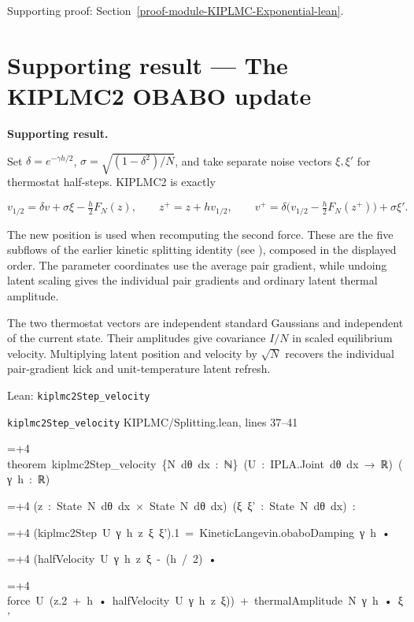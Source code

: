 \documentclass[11pt,a4paper]{report}
\newlength{\leancharwidth}
\newenvironment{leancode}{\par\smallskip\begingroup\ttfamily\footnotesize\raggedright
  \settowidth{\leancharwidth}{M}\setlength{\parskip}{0pt}\setlength{\parindent}{0pt}
  \frenchspacing}{\par\endgroup\smallskip}
\newcommand{\leanline}[2]{\hangindent=\dimexpr#1\leancharwidth+4\leancharwidth\relax
  \hangafter=1\noindent\hspace*{#1\leancharwidth}#2\par}
\newcommand{\leansource}[1]{\par{\footnotesize\color{leanmuted}#1}\par}
\begin{document}
{\small\color{gray}Supporting proof: Section~\ref{proof-module-KIPLMC-Exponential-lean}.\par}
\section{\texorpdfstring{Supporting result — The KIPLMC2 OBABO update}{Supporting result — The KIPLMC2 OBABO update}}


\textbf{Supporting result.}



Set \(\delta=e^{-\gamma h/2}\),
\(\sigma=\sqrt{(1-\delta^2)/N}\), and take separate noise vectors
\(\xi,\xi'\) for thermostat half-steps. KIPLMC2 is exactly


\[v_{1/2}=\delta v+\sigma\xi-\tfrac h2F_N(z),\qquad
z^+=z+hv_{1/2},\qquad
v^+=\delta\bigl(v_{1/2}-\tfrac h2F_N(z^+)\bigr)+\sigma\xi'.\]


The new position is used when recomputing the second force. These are the five subflows of the earlier kinetic splitting identity (see \cite[Section~3.20.1]{LangevinLean2026Kinetic}), composed in the displayed order. The parameter coordinates use the average pair gradient, while undoing latent scaling gives the individual pair gradients and ordinary latent thermal amplitude.



The two thermostat vectors are independent standard Gaussians and independent of the current state. Their amplitudes give covariance \(I/N\) in scaled equilibrium velocity. Multiplying latent position and velocity by \(\sqrt N\) recovers the individual pair-gradient kick and unit-temperature latent refresh.

\begin{leanbox}{Lean: \texttt{kiplmc2Step\_\allowbreak{}velocity}}
\leansource{\texttt{kiplmc2Step\_\allowbreak{}velocity} \quad KIPLMC/\allowbreak{}Splitting.lean, lines 37–41}
\begin{leancode}
\leanline{0}{theorem\ kiplmc2Step\_velocity\ \{N\ dθ\ dx\ :\ ℕ\}\ (U\ :\ IPLA.Joint\ dθ\ dx\ →\ ℝ)\ (γ\ h\ :\ ℝ)}
\leanline{4}{(z\ :\ State\ N\ dθ\ dx\ ×\ State\ N\ dθ\ dx)\ (ξ\ ξ'\ :\ State\ N\ dθ\ dx)\ :}
\leanline{4}{(kiplmc2Step\ U\ γ\ h\ z\ ξ\ ξ').1\ =\ KineticLangevin.obaboDamping\ γ\ h\ •}
\leanline{6}{(halfVelocity\ U\ γ\ h\ z\ ξ\ -\ (h\ /\ 2)\ •}
\leanline{8}{force\ U\ (z.2\ +\ h\ •\ halfVelocity\ U\ γ\ h\ z\ ξ))\ +\ thermalAmplitude\ N\ γ\ h\ •\ ξ'}
\end{leancode}
\end{leanbox}
\end{document}
